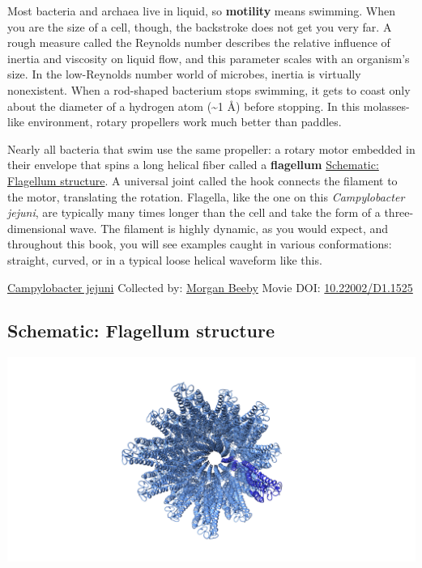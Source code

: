 \documentclass[]{tufte-book}
\begin{document}
Most bacteria and archaea live in liquid, so \textbf{motility} means swimming. When you are the size of a cell, though, the backstroke does not get you very far. A rough measure called the Reynolds number describes the relative influence of inertia and viscosity on liquid flow, and this parameter scales with an organism's size. In the low-Reynolds number world of microbes, inertia is virtually nonexistent. When a rod-shaped bacterium stops swimming, it gets to coast only about the diameter of a hydrogen atom (\textasciitilde{}1 Å) before stopping. In this molasses-like environment, rotary propellers work much better than paddles.

Nearly all bacteria that swim use the same propeller: a rotary motor embedded in their envelope that spins a long helical fiber called a \textbf{flagellum} \protect\hyperlink{Flagellum_structure}{Schematic: Flagellum structure}. A universal joint called the hook connects the filament to the motor, translating the rotation. Flagella, like the one on this \emph{Campylobacter jejuni}, are typically many times longer than the cell and take the form of a three-dimensional wave. The filament is highly dynamic, as you would expect, and throughout this book, you will see examples caught in various conformations: straight, curved, or in a typical loose helical waveform like this.



\hypertarget{htmlwidget-1b3557bf8c3c564bd1ab}{}

\label{fig:6-1}\protect\hyperlink{tree}{Campylobacter jejuni} Collected by: \protect\hyperlink{morgan_beeby}{Morgan Beeby} Movie DOI: \href{https://doi.org/10.22002/D1.1525}{10.22002/D1.1525}

\hypertarget{Flagellum_structure}{%
\subsection*{Schematic: Flagellum structure}\label{Flagellum_structure}}

\includegraphics{img/schematics/6_1_1}
\end{document}
